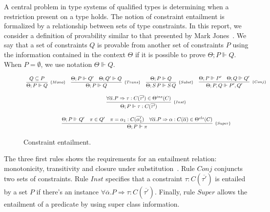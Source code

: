 \documentclass[a4paper, 11pt]{article}
\begin{document}
A central problem in type systems of qualified types is determining 
when a restriction present on a type holds. The notion of 
constraint entailment is formalized by a relationship between 
sets of type constraints. In this report, we consider a definition of 
provability similar to that presented by Mark Jones~\cite{Jones1995}.
We say that a set of constraints $Q$ is provable from another set
of constraints $P$ using the information contained in the 
context $\Theta$ if it is possible to prove $\Theta ; P \Vdash Q$.
When $P = \emptyset$, we use notation $\Theta \Vdash Q$.

\begin{figure}[htb]
  \[
    \begin{array}{cccc}
      \infer[_{\{Mono\}}]
            {\Theta ; P \Vdash Q} 
            {Q \subseteq P} 
      & 
      \infer[_{\{Trans\}}]
            {\Theta ; P \Vdash Q} 
            {\Theta ; P \Vdash Q' 
             & 
             \Theta ; Q' \Vdash Q}
      & 
      \infer[_{\{Subst\}}]
            {\Theta ; S\,P \Vdash S\,Q}
            {\Theta ; P \Vdash Q} 
      & 
      \infer[_{\{Conj\}}]
            {\Theta ; P, Q \Vdash P', Q'}
            {\Theta ; P \Vdash P' & 
             \Theta ; Q \Vdash Q'} 
      \\ \\
      \multicolumn{4}{c}{
        \infer[_{\{Inst\}}]
              {\Theta ; P \Vdash \tau : C(\overline{\tau'}) }
              {\forall \overline{\alpha} .  P \Rightarrow \tau : C(\overline{\tau'}) \in \Theta^{ins}(C)}
      } 
      \\ \\
      \multicolumn{4}{c}{
        \infer[_{\{Super\}}]
              {\Theta ; P \Vdash \pi}
              {\Theta ; P \Vdash Q' & 
               \pi \in Q' &
               \pi = \alpha_1 : C(\overline{\alpha'_1}) & 
               \forall\overline{\alpha}. P \Rightarrow \alpha : C(\overline{\alpha}) \in \Theta^{cls}(C)} 
      }
    \end{array}
  \]
  \centering
  \caption{Constraint entailment.}
  \label{fig:constraint-entailment}
\end{figure}
The three first rules shows the requirements for an entailment 
relation: monotonicity, transitivity and closure under 
substitution~\cite{Jones1995}. Rule $Conj$ conjuncts two sets 
of constraints. Rule $Inst$ specifies that a constraint 
$\tau : C(\overline{\tau'})$ is entailed by a set $P$ if 
there's an instance 
$\forall \overline{\alpha} .  P \Rightarrow \tau : C(\overline{\tau'})$. 
Finally, rule $Super$ allows the entailment of a predicate 
by using super class information.
\end{document}
